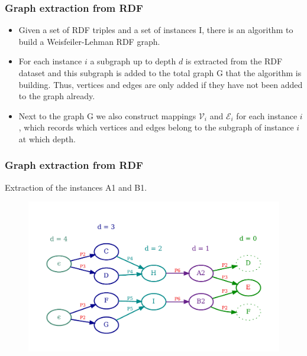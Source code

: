 \documentclass{beamer}
\begin{document}
\begin{frame}
\frametitle{Graph extraction from RDF}

\begin{itemize}
\item
Given a set of RDF triples and a set of instances I, there is an algorithm to build a Weisfeiler-Lehman RDF graph.

\item
For each instance $i$ a subgraph up to depth $d$ is extracted from the RDF dataset and this subgraph is added to the total graph G that the algorithm is building. Thus, vertices and edges are only added if they have not been added to the graph already.

\item
Next to the graph G we also construct mappings $\mathcal{V}_i$ and $\mathcal{E}_i$ for each instance $i$, which records which vertices and edges belong to the subgraph of instance $i$ at which depth.
\end{itemize}

\end{frame}


\begingroup
\small
\begin{frame}
\frametitle{Graph extraction from RDF}

Extraction of the instances A1 and B1.

\begin{center}
\begin{figure}
\includegraphics[width=\textwidth,keepaspectratio]{img/07-subGraph_A1_B1}
\end{figure}
\end{center}

\end{frame}
\endgroup
\end{document}
